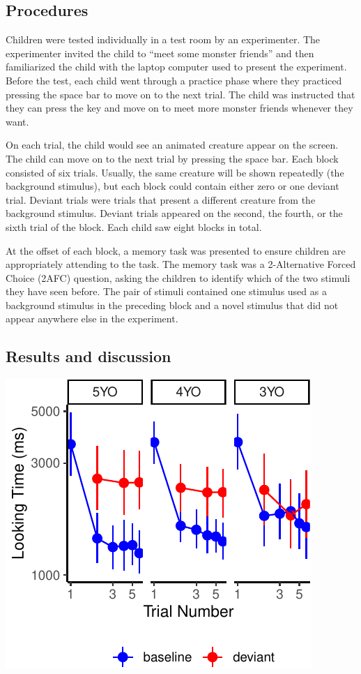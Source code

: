 \documentclass[10pt, letterpaper]{article}
\newenvironment{CodeChunk}{}{}
\begin{document}
\hypertarget{procedures}{%
\subsection{Procedures}\label{procedures}}

Children were tested individually in a test room by an experimenter. The
experimenter invited the child to ``meet some monster friends'' and then
familiarized the child with the laptop computer used to present the
experiment. Before the test, each child went through a practice phase
where they practiced pressing the space bar to move on to the next
trial. The child was instructed that they can press the key and move on
to meet more monster friends whenever they want.

On each trial, the child would see an animated creature appear on the
screen. The child can move on to the next trial by pressing the space
bar. Each block consisted of six trials. Usually, the same creature will
be shown repeatedly (the background stimulus), but each block could
contain either zero or one deviant trial. Deviant trials were trials
that present a different creature from the background stimulus. Deviant
trials appeared on the second, the fourth, or the sixth trial of the
block. Each child saw eight blocks in total.

At the offset of each block, a memory task was presented to ensure
children are appropriately attending to the task. The memory task was a
2-Alternative Forced Choice (2AFC) question, asking the children to
identify which of the two stimuli they have seen before. The pair of
stimuli contained one stimulus used as a background stimulus in the
preceding block and a novel stimulus that did not appear anywhere else
in the experiment.

\hypertarget{results-and-discussion}{%
\subsection{Results and discussion}\label{results-and-discussion}}

\begin{CodeChunk}

\includegraphics{figs/unnamed-chunk-10-1} \end{CodeChunk}
\end{document}
